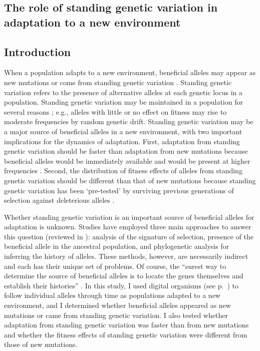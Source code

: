 \begin{doublespace}

\chapter{The role of standing genetic variation
  in adaptation to a new environment}
\label{chap:sgv}



\section{Introduction}



When a population adapts to a new environment,
beneficial alleles may appear as new mutations
or come from standing genetic variation \citep{bar08}.
%
Standing genetic variation refers to the presence
of alternative alleles at each genetic locus in a population.
%
Standing genetic variation may be maintained
in a population for several reasons \citep{har97};
e.g., alleles with little or no effect on fitness
may rise to moderate frequencies by random genetic drift.
%
Standing genetic variation may be a major source
of beneficial alleles in a new environment,
with two important implications for the dynamics of adaptation.
%
First, adaptation from standing genetic variation
should be faster than adaptation from new mutations
because beneficial alleles would be immediately available
and would be present at higher frequencies \citep{bar08}.
%
Second, the distribution of fitness effects of alleles
from standing genetic variation should be different
than that of new mutations because standing genetic variation
has been `pre-tested' by surviving previous generations
of selection against deleterious alleles \citep{bar08}.



Whether standing genetic variation is an important source
of beneficial alleles for adaptation is unknown.
%
Studies have employed three main approaches
to answer this question (reviewed in \citet{bar08}):
analysis of the signature of selection,
presence of the beneficial allele in the ancestral population,
and phylogenetic analysis for inferring the history of alleles.
%
These methods, however, are necessarily indirect
and each has their unique set of problems.
%
Of course, the ``surest way to determine
the source of beneficial alleles is to locate
the genes themselves and establish their histories'' \citep{bar08}.
%
In this study, I used digital organisms (see p.~\pageref{sec:avida})
to follow individual alleles through time
as populations adapted to a new environment,
and I determined whether beneficial alleles
appeared as new mutations or came from standing genetic variation.
%
I also tested whether adaptation from standing genetic variation
was faster than from new mutations
and whether the fitness effects of standing genetic variation
were different from those of new mutations.




\end{doublespace}
